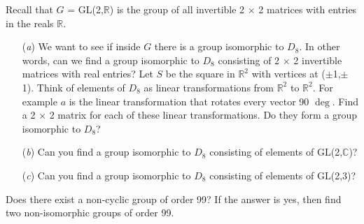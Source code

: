 \documentclass[12pt,letterpaper,boxed]{hmcpset}
\begin{document}
\begin{problem}[2.4.6]
Recall that $G$ = GL(2,$\mathbb{R}$) is the group of all invertible 2 $\times$ 2 matrices with entries in the reals $\mathbb{R}$. 
\begin{itemize}
  \item[(\textit{a})] We want to see if inside $G$ there is a group isomorphic to $D_8$. In other words, can we find a group isomorphic to $D_8$ consisting of 2 $\times$ 2 invertible matrices with real entries? \newline Let $S$ be the square in $\mathbb{R}^2$ with vertices at ($\pm$1,$\pm$1). Think of elements of $D_8$ as linear transformations from $\mathbb{R}^2$ to $\mathbb{R}^2$. For example $a$ is the linear transformation that rotates every vector 90 $\deg$. Find a 2 $\times$ 2 matrix for each of these linear transformations. Do they form a group isomorphic to $D_8$?
  
  \item[(\textit{b})] Can you find a group isomorphic to $D_8$ consisting of elements of GL(2,$\mathbb{C}$)?
  
  \item[(\textit{c})] Can you find a group isomorphic to $D_8$ consisting of elements of GL(2,3)?
\end{itemize}
\end{problem}

\begin{solution}
\end{solution}

\clearpage

\begin{problem}[2.5.3]
Does there exist a non-cyclic group of order 99? If the answer is yes, then find two non-isomorphic groups of order 99. 
\end{problem}

\begin{solution}

\end{solution}
\end{document}
